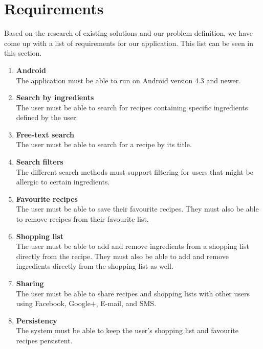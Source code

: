 \section{Requirements}\label{sec:requirement}

Based on the research of existing solutions and our problem definition, we have come up with a list of requirements for our application. This list can be seen in this section.

\begin{enumerate}
  \item\label{req:android} \textbf{Android} \\
    The application must be able to run on Android version 4.3 and newer.
    
  \item\label{req:ingredientsearch} \textbf{Search by ingredients} \\
    The user must be able to search for recipes containing specific ingredients defined by the user.
    
  \item\label{req:recipesearch} \textbf{Free-text search} \\
    The user must be able to search for a recipe by its title.
    
  \item\label{req:searchfilters} \textbf{Search filters} \\
    The different search methods must support filtering for users that might be allergic to certain ingredients.
    
  \item\label{req:favourite} \textbf{Favourite recipes} \\
    The user must be able to save their favourite recipes. They must also be able to remove recipes from their favourite list.
    
  \item\label{req:shoppinglist} \textbf{Shopping list} \\
    The user must be able to add and remove ingredients from a shopping list directly from the recipe. They must also be able to add and remove ingredients directly from the shopping list as well.
    
  \item\label{req:sharing} \textbf{Sharing} \\
    The user must be able to share recipes and shopping lists with other users using Facebook, Google+, E-mail, and SMS.
    
  \item\label{req:persistency} \textbf{Persistency} \\
    The system must be able to keep the user's shopping list and favourite recipes persistent.
    

\end{enumerate}
